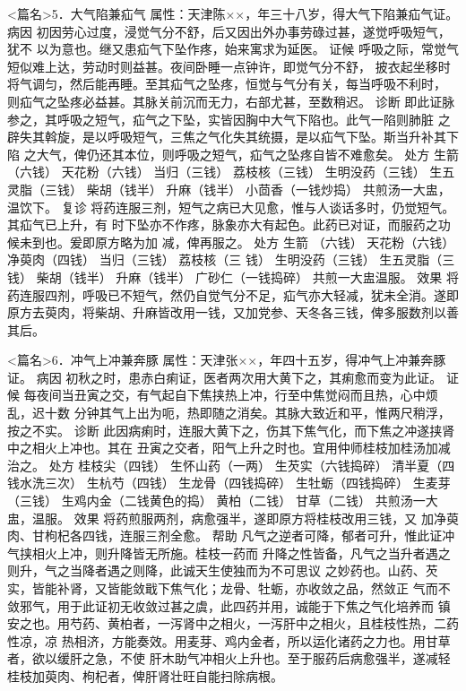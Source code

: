 \documentclass[a4paper,12pt,UTF8,twoside]{ctexbook}
\begin{document}
<篇名>5．大气陷兼疝气
属性：天津陈××，年三十八岁，得大气下陷兼疝气证。 
病因 初因劳心过度，浸觉气分不舒，后又因出外办事劳碌过甚，遂觉呼吸短气，犹不 
以为意也。继又患疝气下坠作疼，始来寓求为延医。 
证候 呼吸之际，常觉气短似难上达，劳动时则益甚。夜间卧睡一点钟许，即觉气分不舒， 
披衣起坐移时将气调匀，然后能再睡。至其疝气之坠疼，恒觉与气分有关，每当呼吸不利时， 
则疝气之坠疼必益甚。其脉关前沉而无力，右部尤甚，至数稍迟。 
诊断 即此证脉参之，其呼吸之短气，疝气之下坠，实皆因胸中大气下陷也。此气一陷则肺脏 
之辟失其斡旋，是以呼吸短气，三焦之气化失其统摄，是以疝气下坠。斯当升补其下陷 
之大气，俾仍还其本位，则呼吸之短气，疝气之坠疼自皆不难愈矣。 
处方 生箭 （六钱） 天花粉（六钱） 当归（三钱） 荔枝核（三钱） 
生明没药（三钱） 生五灵脂（三钱） 柴胡（钱半） 升麻（钱半） 小茴香（一钱炒捣） 
共煎汤一大盅，温饮下。 
复诊 将药连服三剂，短气之病已大见愈，惟与人谈话多时，仍觉短气。其疝气已上升，有 
时下坠亦不作疼，脉象亦大有起色。此药已对证，而服药之功候未到也。爰即原方略为加 
减，俾再服之。 
处方 生箭 （六钱） 天花粉（六钱） 净萸肉（四钱） 当归（三钱） 荔枝核（三 
钱） 生明没药（三钱） 生五灵脂（三钱） 柴胡（钱半） 升麻（钱半） 广砂仁（一钱捣碎） 
共煎一大盅温服。 
效果 将药连服四剂，呼吸已不短气，然仍自觉气分不足，疝气亦大轻减，犹未全消。遂即 
原方去萸肉，将柴胡、升麻皆改用一钱，又加党参、天冬各三钱，俾多服数剂以善其后。 


<篇名>6．冲气上冲兼奔豚
属性：天津张××，年四十五岁，得冲气上冲兼奔豚证。 
病因 初秋之时，患赤白痢证，医者两次用大黄下之，其痢愈而变为此证。 
证候 每夜间当丑寅之交，有气起自下焦挟热上冲，行至中焦觉闷而且热，心中烦乱，迟十数 
分钟其气上出为呃，热即随之消矣。其脉大致近和平，惟两尺稍浮，按之不实。 
诊断 此因病痢时，连服大黄下之，伤其下焦气化，而下焦之冲遂挟肾中之相火上冲也。其在 
丑寅之交者，阳气上升之时也。宜用仲师桂枝加桂汤加减治之。 
处方 桂枝尖（四钱） 生怀山药（一两） 生芡实（六钱捣碎） 清半夏（四钱水洗三次） 
生杭芍（四钱） 生龙骨（四钱捣碎） 生牡蛎（四钱捣碎） 生麦芽（三钱） 
生鸡内金（二钱黄色的捣） 黄柏（二钱） 甘草（二钱） 
共煎汤一大盅，温服。 
效果 将药煎服两剂，病愈强半，遂即原方将桂枝改用三钱，又 
加净萸肉、甘枸杞各四钱，连服三剂全愈。 
帮助 凡气之逆者可降，郁者可升，惟此证冲气挟相火上冲，则升降皆无所施。桂枝一药而 
升降之性皆备，凡气之当升者遇之则升，气之当降者遇之则降，此诚天生使独而为不可思议 
之妙药也。山药、芡实，皆能补肾，又皆能敛戢下焦气化；龙骨、牡蛎，亦收敛之品，然敛正 
气而不敛邪气，用于此证初无收敛过甚之虞，此四药并用，诚能于下焦之气化培养而 
镇安之也。用芍药、黄柏者，一泻肾中之相火，一泻肝中之相火，且桂枝性热，二药性凉，凉 
热相济，方能奏效。用麦芽、鸡内金者，所以运化诸药之力也。用甘草者，欲以缓肝之急，不使 
肝木助气冲相火上升也。至于服药后病愈强半，遂减轻桂枝加萸肉、枸杞者，俾肝肾壮旺自能扫除病根。 
\end{document}
